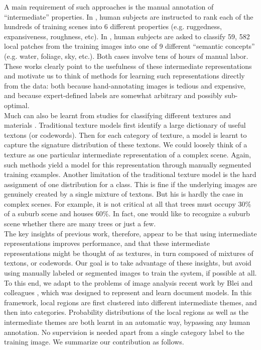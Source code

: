 \documentclass[10pt,a4paper,twocolumn]{article}
\begin{document}
\hspace{.5cm}A main requirement of such approaches is the manual annotation of “intermediate” properties. In \cite{oliva}, human subjects are instructed to rank each of the hundreds of training scenes into 6 different properties (e.g. ruggedness, expansiveness, roughness, etc). In \cite{vogel}, human subjects are asked to classify 59, 582 local patches from the training images into one of 9 different “semantic concepts” (e.g. water, foliage, sky, etc.). Both cases involve tens of hours of manual labor. These works clearly point to the usefulness of these intermediate representations and motivate us to think of methods for learning such representations directly from the data: both because hand-annotating images is tedious and expensive, and because expert-defined labels are somewhat arbitrary and possibly sub-optimal.\\

\hspace{.5cm}Much can also be learnt from studies for classifying different textures and materials \cite{portilla, malik, varma}. Traditional texture models first identify a large dictionary of useful textons (or codewords). Then for each category of texture, a model is learnt to capture the signature distribution of these textons.
We could loosely think of a texture as one particular intermediate representation of a complex scene. Again, such methods yield a model for this representation through manually segmented training examples. Another limitation of the traditional texture model is the hard assignment of one distribution for a class. This is fine if the underlying images are genuinely created by a single mixture of textons. But his is hardly the case in complex scenes. For example, it is not critical at all that trees must occupy 30\% of a suburb scene and houses 60\%. In fact, one would like to recognize a suburb scene whether there are many trees or just a few.\\

\hspace{.5cm}The key insights of previous work, therefore, appear to be that using intermediate representations improves performance, and that these intermediate representations might be thought of as textures, in turn composed of mixtures of textons, or codewords. Our goal is to take advantage of these
insights, but avoid using manually labeled or segmented images to train the system, if possible at all. To this end, we adapt to the problems of image analysis recent work by Blei and colleagues \cite{blei}, which was designed to represent and learn document models. In this framework, local regions are first clustered into different intermediate themes, and then into categories. Probability distributions of the local regions as well as the intermediate themes are both learnt in an automatic way, bypassing any human annotation. No supervision is needed apart from a single category label to the training image. We summarize our contribution as follows.
\end{document}
